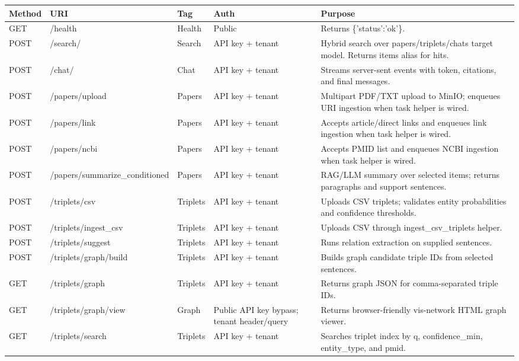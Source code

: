 \documentclass[10pt,letterpaper]{article}
\begin{document}
\begin{scriptsize}
\begin{longtable}{>{\raggedright\arraybackslash}p{1.34in}>{\raggedright\arraybackslash}p{1.34in}>{\raggedright\arraybackslash}p{1.34in}>{\raggedright\arraybackslash}p{1.34in}>{\raggedright\arraybackslash}p{1.34in}}
Method & URI & Tag & Auth & Purpose \\
\hline
GET & /health & Health & Public & Returns \{'status':'ok'\}. \\
POST & /search/ & Search & API key + tenant & Hybrid search over papers/triplets/chats target model. Returns items alias for hits. \\
POST & /chat/ & Chat & API key + tenant & Streams server-sent events with token, citations, and final messages. \\
POST & /papers/upload & Papers & API key + tenant & Multipart PDF/TXT upload to MinIO; enqueues URI ingestion when task helper is wired. \\
POST & /papers/link & Papers & API key + tenant & Accepts article/direct links and enqueues link ingestion when task helper is wired. \\
POST & /papers/ncbi & Papers & API key + tenant & Accepts PMID list and enqueues NCBI ingestion when task helper is wired. \\
POST & /papers/summarize\_conditioned & Papers & API key + tenant & RAG/LLM summary over selected items; returns paragraphs and support sentences. \\
POST & /triplets/csv & Triplets & API key + tenant & Uploads CSV triplets; validates entity probabilities and confidence thresholds. \\
POST & /triplets/ingest\_csv & Triplets & API key + tenant & Uploads CSV through ingest\_csv\_triplets helper. \\
POST & /triplets/suggest & Triplets & API key + tenant & Runs relation extraction on supplied sentences. \\
POST & /triplets/graph/build & Triplets & API key + tenant & Builds graph candidate triple IDs from selected sentences. \\
GET & /triplets/graph & Triplets & API key + tenant & Returns graph JSON for comma-separated triple IDs. \\
GET & /triplets/graph/view & Graph & Public API key bypass; tenant header/query & Returns browser-friendly vis-network HTML graph viewer. \\
GET & /triplets/search & Triplets & API key + tenant & Searches triplet index by q, confidence\_min, entity\_type, and pmid. \\

\end{longtable}
\end{scriptsize}
\end{document}

